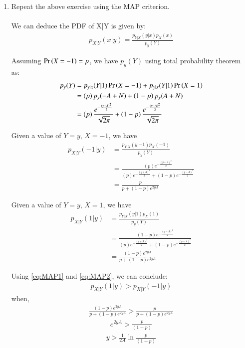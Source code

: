 \documentclass[journal,12pt,twocolumn]{IEEEtran}
\renewcommand\thesection{\arabic{section}}
\begin{document}
\begin{enumerate}[label=\thesection.\arabic*
,ref=\thesection.\theenumi]
\item Repeat the above exercise using the MAP criterion.
	\\
	\solution
	\\
	We can deduce the PDF of X|Y is given by:
	\begin{align}
		p_{X|Y}(x|y) = \frac{p_{Y|X}(y|x) p_X(x)}{p_y(Y)}
		\label{eq:Bayes}
	\end{align}

	Assuming $\Pr\left(X = -1\right) = p$, we have $p_y(Y)$ using total probability theorem as:
	\begin{align}
		p_y(Y) &= p_{y|x}(Y|1) \Pr\left(X=-1\right) + p_{y|x}(Y|1) \Pr\left(X=1\right) \\
		&= \left(p\right) p_y(-A+N) + \left(1-p\right) p_y(A+N) \\
		&= \left(p\right) \frac{e^{-\frac{(y+A)^2}{2}}}{\sqrt{2\pi}} + \left(1-p\right) \frac{e^{-\frac{(y-A)^2}{2}}}{\sqrt{2\pi}}
	\end{align}

	Given a value of $Y = y$, $X = -1$, we have
	\begin{align}
		p_{X|Y}(-1|y) &= \frac{p_{Y|X}(y|-1) p_X(-1)}{p_y(Y)} \\
		&= \frac{\left(p\right) e^{-\frac{(y+A)^2}{2}}}{\left(p\right) e^{-\frac{(y+A)^2}{2}} + \left(1-p\right) e^{-\frac{(y-A)^2}{2}}} \\
		&= \frac{p}{p + \left(1-p\right) e^{2yA}}
		\label{eq:MAP1}
	\end{align}

	Given a value of $Y = y$, $X = 1$, we have
	\begin{align}
		p_{X|Y}(1|y) &= \frac{p_{Y|X}(y|1) p_X(1)}{p_y(Y)} \\
		&= \frac{\left(1-p\right) e^{-\frac{(y-A)^2}{2}}}{\left(p\right) e^{-\frac{(y+A)^2}{2}} + \left(1-p\right) e^{-\frac{(y-A)^2}{2}}} \\
		&= \frac{\left(1-p\right) e^{2yA}}{p + \left(1-p\right) e^{2yA}}
		\label{eq:MAP2}
	\end{align}

	Using \eqref{eq:MAP1} and \eqref{eq:MAP2}, we can conclude:
	\begin{align}
		p_{X|Y}(1|y) > p_{X|Y}(-1|y)
	\end{align}
	when,
	\begin{align}
		\frac{\left(1-p\right) e^{2yA}}{p + \left(1-p\right) e^{2yA}} > \frac{p}{p + \left(1-p\right) e^{2yA}}
	\end{align}
	\begin{align}
		e^{2yA} > \frac{p}{\left(1-p\right)}
	\end{align}
	\begin{align}
		y > \frac{1}{2A} \ln{\frac{p}{\left(1-p\right)}}
		\label{eq:MapCond}
	\end{align}


\end{enumerate}
\end{document}
